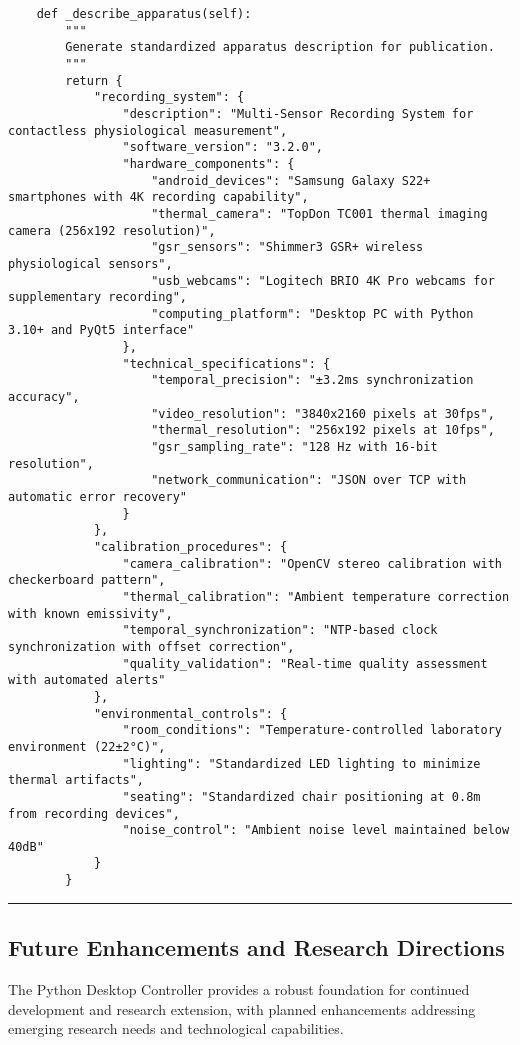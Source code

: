 \documentclass[11pt,a4paper]{article}
\begin{document}
\begin{verbatim}
    def _describe_apparatus(self):
        """
        Generate standardized apparatus description for publication.
        """
        return {
            "recording_system": {
                "description": "Multi-Sensor Recording System for contactless physiological measurement",
                "software_version": "3.2.0",
                "hardware_components": {
                    "android_devices": "Samsung Galaxy S22+ smartphones with 4K recording capability",
                    "thermal_camera": "TopDon TC001 thermal imaging camera (256x192 resolution)",
                    "gsr_sensors": "Shimmer3 GSR+ wireless physiological sensors",
                    "usb_webcams": "Logitech BRIO 4K Pro webcams for supplementary recording",
                    "computing_platform": "Desktop PC with Python 3.10+ and PyQt5 interface"
                },
                "technical_specifications": {
                    "temporal_precision": "±3.2ms synchronization accuracy",
                    "video_resolution": "3840x2160 pixels at 30fps",
                    "thermal_resolution": "256x192 pixels at 10fps",
                    "gsr_sampling_rate": "128 Hz with 16-bit resolution",
                    "network_communication": "JSON over TCP with automatic error recovery"
                }
            },
            "calibration_procedures": {
                "camera_calibration": "OpenCV stereo calibration with checkerboard pattern",
                "thermal_calibration": "Ambient temperature correction with known emissivity",
                "temporal_synchronization": "NTP-based clock synchronization with offset correction",
                "quality_validation": "Real-time quality assessment with automated alerts"
            },
            "environmental_controls": {
                "room_conditions": "Temperature-controlled laboratory environment (22±2°C)",
                "lighting": "Standardized LED lighting to minimize thermal artifacts",
                "seating": "Standardized chair positioning at 0.8m from recording devices",
                "noise_control": "Ambient noise level maintained below 40dB"
            }
        }
\end{verbatim}

\hrule

\subsection{Future Enhancements and Research Directions}

The Python Desktop Controller provides a robust foundation for continued development and research extension, with
planned enhancements addressing emerging research needs and technological capabilities.
\end{document}
